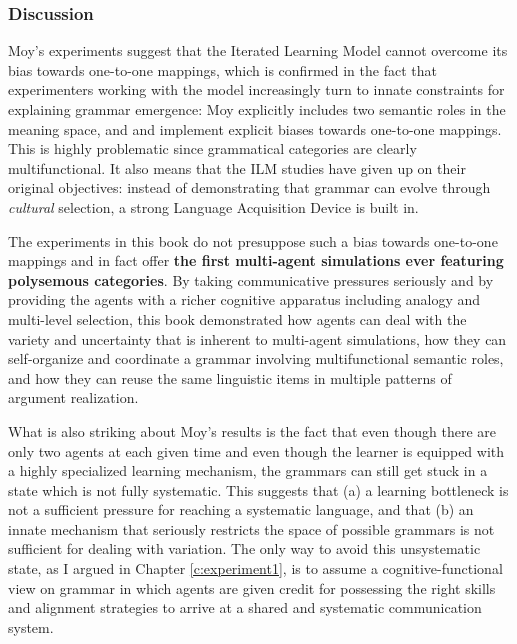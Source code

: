 \subsubsection{Discussion}
Moy's experiments suggest that the Iterated Learning Model cannot overcome its bias towards one-to-one mappings, which is confirmed in the fact that experimenters working with the model increasingly turn to innate constraints for explaining grammar emergence: Moy explicitly includes two semantic roles in the meaning space, and \citet{smith03transmission} and \citet{smith03language} implement explicit biases towards one-to-one mappings. This is highly problematic since grammatical categories are clearly multifunctional. It also means that the ILM studies have given up on their original objectives: instead of demonstrating that grammar can evolve through {\em cultural} selection, a strong Language Acquisition Device is built in. 

The experiments in this book do not presuppose such a bias towards one-to-one mappings and in fact offer {\bfseries the first multi-agent simulations ever featuring polysemous categories}. By taking communicative pressures seriously and by providing the agents with a richer cognitive apparatus including analogy and multi-level selection, this book demonstrated how agents can deal with the variety and uncertainty that is inherent to multi-agent simulations, how they can self-organize and coordinate a grammar involving multifunctional semantic roles, and how they can reuse the same linguistic items in multiple patterns of argument realization.

What is also striking about Moy's results is the fact that even though there are only two agents at each given time and even though the learner is equipped with a highly specialized learning mechanism, the grammars can still get stuck in a state which is not fully systematic. This suggests that (a) a learning bottleneck is not a sufficient pressure for reaching a systematic language, and that (b) an innate mechanism that seriously restricts the space of possible grammars is not sufficient for dealing with variation. The only way to avoid this unsystematic state, as I argued in Chapter \ref{c:experiment1}, is to assume a cognitive-functional view on grammar in which agents are given credit for possessing the right skills and alignment strategies to arrive at a shared and systematic communication system.

